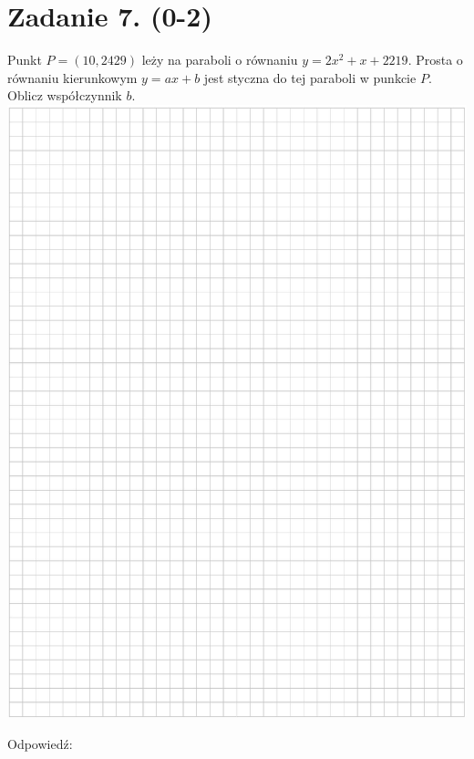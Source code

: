 \documentclass[10pt]{article}
\begin{document}
\section*{Zadanie 7. (0-2)}
Punkt \(P=(10,2429)\) leży na paraboli o równaniu \(y=2 x^{2}+x+2219\). Prosta o równaniu kierunkowym \(y=a x+b\) jest styczna do tej paraboli w punkcie \(P\). Oblicz współczynnik \(b\).\\
\includegraphics[max width=\textwidth, center]{2024_11_21_9df891ea1c7ef9791261g-06}

Odpowiedź: \(\qquad\)
\end{document}
